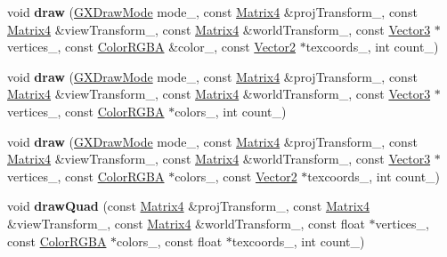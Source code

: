 \begin{DoxyCompactItemize}
\item 
void {\bfseries draw} (\hyperlink{class_i_dream_sky_1_1_g_x_draw_mode}{G\+X\+Draw\+Mode} mode\+\_\+, const \hyperlink{class_i_dream_sky_1_1_matrix4}{Matrix4} \&proj\+Transform\+\_\+, const \hyperlink{class_i_dream_sky_1_1_matrix4}{Matrix4} \&view\+Transform\+\_\+, const \hyperlink{class_i_dream_sky_1_1_matrix4}{Matrix4} \&world\+Transform\+\_\+, const \hyperlink{class_i_dream_sky_1_1_vector3}{Vector3} $\ast$vertices\+\_\+, const \hyperlink{class_i_dream_sky_1_1_color_r_g_b_a}{Color\+R\+G\+BA} \&color\+\_\+, const \hyperlink{class_i_dream_sky_1_1_vector2}{Vector2} $\ast$texcoords\+\_\+, int count\+\_\+)\hypertarget{class_i_dream_sky_1_1_g_x_context_af36b043da46fb937c9aa98108d8de178}{}\label{class_i_dream_sky_1_1_g_x_context_af36b043da46fb937c9aa98108d8de178}

\item 
void {\bfseries draw} (\hyperlink{class_i_dream_sky_1_1_g_x_draw_mode}{G\+X\+Draw\+Mode} mode\+\_\+, const \hyperlink{class_i_dream_sky_1_1_matrix4}{Matrix4} \&proj\+Transform\+\_\+, const \hyperlink{class_i_dream_sky_1_1_matrix4}{Matrix4} \&view\+Transform\+\_\+, const \hyperlink{class_i_dream_sky_1_1_matrix4}{Matrix4} \&world\+Transform\+\_\+, const \hyperlink{class_i_dream_sky_1_1_vector3}{Vector3} $\ast$vertices\+\_\+, const \hyperlink{class_i_dream_sky_1_1_color_r_g_b_a}{Color\+R\+G\+BA} $\ast$colors\+\_\+, int count\+\_\+)\hypertarget{class_i_dream_sky_1_1_g_x_context_a3e245440e97e8c266d894c87a7fe6f38}{}\label{class_i_dream_sky_1_1_g_x_context_a3e245440e97e8c266d894c87a7fe6f38}

\item 
void {\bfseries draw} (\hyperlink{class_i_dream_sky_1_1_g_x_draw_mode}{G\+X\+Draw\+Mode} mode\+\_\+, const \hyperlink{class_i_dream_sky_1_1_matrix4}{Matrix4} \&proj\+Transform\+\_\+, const \hyperlink{class_i_dream_sky_1_1_matrix4}{Matrix4} \&view\+Transform\+\_\+, const \hyperlink{class_i_dream_sky_1_1_matrix4}{Matrix4} \&world\+Transform\+\_\+, const \hyperlink{class_i_dream_sky_1_1_vector3}{Vector3} $\ast$vertices\+\_\+, const \hyperlink{class_i_dream_sky_1_1_color_r_g_b_a}{Color\+R\+G\+BA} $\ast$colors\+\_\+, const \hyperlink{class_i_dream_sky_1_1_vector2}{Vector2} $\ast$texcoords\+\_\+, int count\+\_\+)\hypertarget{class_i_dream_sky_1_1_g_x_context_a24ae804ad64d1ff2f0e7763aa2208b23}{}\label{class_i_dream_sky_1_1_g_x_context_a24ae804ad64d1ff2f0e7763aa2208b23}

\item 
void {\bfseries draw\+Quad} (const \hyperlink{class_i_dream_sky_1_1_matrix4}{Matrix4} \&proj\+Transform\+\_\+, const \hyperlink{class_i_dream_sky_1_1_matrix4}{Matrix4} \&view\+Transform\+\_\+, const \hyperlink{class_i_dream_sky_1_1_matrix4}{Matrix4} \&world\+Transform\+\_\+, const float $\ast$vertices\+\_\+, const \hyperlink{class_i_dream_sky_1_1_color_r_g_b_a}{Color\+R\+G\+BA} $\ast$colors\+\_\+, const float $\ast$texcoords\+\_\+, int count\+\_\+)\hypertarget{class_i_dream_sky_1_1_g_x_context_a66f38f58592a36bc0bc708137cac73ca}{}\label{class_i_dream_sky_1_1_g_x_context_a66f38f58592a36bc0bc708137cac73ca}


\end{DoxyCompactItemize}
